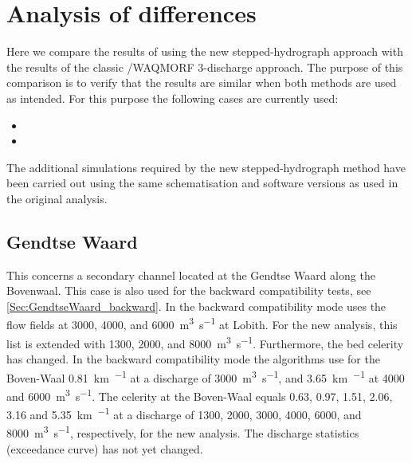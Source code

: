 \chapter{Analysis of differences} \label{Chp:Verschil}

Here we compare the results of \dfastmi using the new stepped-hydrograph approach with the results of the classic /WAQMORF 3-discharge approach.
The purpose of this comparison is to verify that the results are similar when both methods are used as intended.
For this purpose the following cases are currently used:

\begin{itemize}
\item {}
\item {}
\end{itemize}

The additional simulations required by the new stepped-hydrograph method have been carried out using the same schematisation and software versions as used in the original analysis.



\section{Gendtse Waard}\label{Sec:GendtseWaard}
This concerns a secondary channel located at the Gendtse Waard along the Bovenwaal.
This case is also used for the backward compatibility tests, see \autoref{Sec:GendtseWaard_backward}.
In the backward compatibility mode \dfmi uses the flow fields at 3000, 4000, and \SI{6000}{\metre\cubed\per\second} at Lobith.
For the new analysis, this list is extended with 1300, 2000, and \SI{8000}{\metre\cubed\per\second}.
Furthermore, the bed celerity has changed.
In the backward compatibility mode the algorithms use for the Boven-Waal \SI{0.81}{\kilo\metre\per\year} at a discharge of \SI{3000}{\metre\cubed\per\second}, and \SI{3.65}{\kilo\metre\per\year} at 4000 and \SI{6000}{\metre\cubed\per\second}.
The celerity at the Boven-Waal equals 0.63, 0.97, 1.51, 2.06, 3.16 and \SI{5.35}{\kilo\metre\per\year} at a discharge of 1300, 2000, 3000, 4000, 6000, and \SI{8000}{\metre\cubed\per\second}, respectively, for the new analysis.
The discharge statistics (exceedance curve) has not yet changed.

